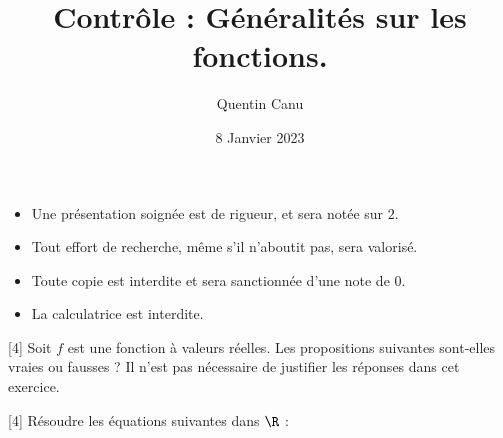 \documentclass{exam}
\title{Contrôle : Généralités sur les fonctions.}
\author{Quentin Canu}
\date{8 Janvier 2023}
\begin{document}
\maketitle
\begin{itemize}
\item Une présentation soignée est de rigueur, et sera notée sur $2$.
\item Tout effort de recherche, même s'il n'aboutit pas, sera valorisé.
\item Toute copie est interdite et sera sanctionnée d'une note de $0$.
\item La calculatrice est interdite.
\end{itemize}
\vspace{0.5cm}
\begin{questions}
[4]
Soit $f$ est une fonction à valeurs réelles. Les propositions suivantes sont-elles vraies ou fausses ? Il n'est pas nécessaire de justifier les réponses dans cet exercice.
\vspace{0.5cm}
[4]
Résoudre les équations suivantes dans $\R$ :
\end{questions}
\end{document}

